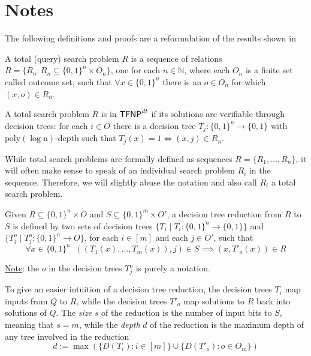 \hypersetup{colorlinks=true, linkcolor=blue, citecolor=red}

\chapter{Notes} \label{chap:notes}

The following definitions and proofs are a reformulation of the results shown in \cite{tfnp_characterization, separations_proof_complexity,proofs_circuits_communication}

\begin{definition}
    A total (query) search problem $R$ is a sequence of relations $R = \{R_n : R_n \subseteq \{0,1\}^n \times O_n\}$, one for each $n \in \mathbb{N}$, where each $O_n$ is a finite set called outcome set, such that $\forall x \in \{0,1\}^n$ there is an $o \in O_n$ for which $(x,o) \in R_n$.

    A total search problem $R$ is in $\mathsf{TFNP}^{dt}$ if its solutions are verifiable through decision trees: for each $i \in O$ there is a decision tree $T_j : \{0,1\}^n \to \{0,1\}$ with $\mathrm{poly(\log n)}$-depth such that $T_j(x) = 1 \iff (x,j) \in R_n$.
\end{definition}

While total search problems are formally defined as sequences $R = \{R_1, \ldots, R_n\}$, it will often make sense to speak of an individual search problem $R_i$ in the sequence. Therefore, we will slightly abuse the notation and also call $R_i$ a total search problem.

\begin{definition}
    Given $R \subseteq \{0,1\}^n \times O$ and $S \subseteq \{0,1\}^m \times O'$, a decision tree reduction from $R$ to $S$ is defined by two sets of decision trees $\{T_i \mid T_i : \{0,1\}^n \to \{0,1\}\}$ and $\{T^o_j \mid T^o_j : \{0,1\}^n \to O\}$, for each $i \in [m]$ and each $j \in O'$, such that
    \[\forall x \in \{0,1\}^n \;\; ((T_1(x), \ldots, T_m(x)), j) \in S \implies (x, T'_o(x)) \in R\]

    \underline{Note}: the $o$ in the decision trees $T^o_j$ is purely a notation. 
\end{definition}

To give an easier intuition of a decision tree reduction, the decision trees $T_i$ map inputs from $Q$ to $R$, while the decision trees $T'_o$ map solutions to $R$ back into solutions of $Q$. The \textit{size} $s$ of the reduction is the number of input bits to $S$, meaning that $s = m$, while the \textit{depth} $d$ of the reduction is the maximum depth of any tree involved in the reduction
\[d := \max(\{D(T_i) : i \in [m]\} \cup \{D(T'_o) : o \in O_m\})\]

